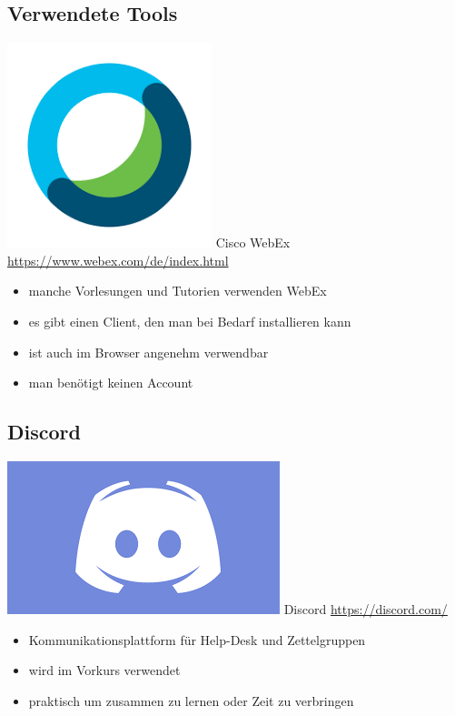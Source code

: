 \subsection{Verwendete Tools}
\begin{frame}{\includegraphics[scale=0.092]{images/webex.png} Cisco WebEx}
	\url{https://www.webex.com/de/index.html}
	\begin{itemize}
		\item manche Vorlesungen und Tutorien verwenden WebEx
		\item es gibt einen Client, den man bei Bedarf installieren kann
		\item ist auch im Browser angenehm verwendbar
		\item man benötigt keinen Account
	\end{itemize}
	
\end{frame}

\subsection{Discord}
\begin{frame}{\includegraphics[scale=0.092]{images/discord.png} Discord}
	\url{https://discord.com/}
	\begin{itemize}
		\item Kommunikationsplattform für Help-Desk und Zettelgruppen
		\item wird im Vorkurs verwendet
		\item praktisch um zusammen zu lernen oder Zeit zu verbringen
	\end{itemize}
\end{frame}

